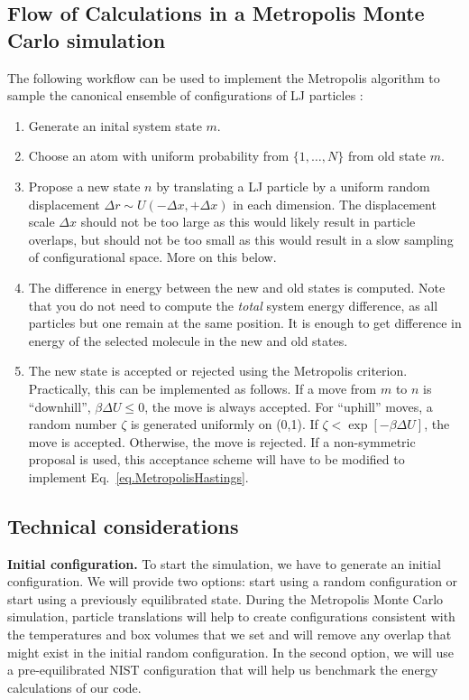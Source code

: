 \documentclass[aip,jcp,preprint,superscriptaddress,floatfix]{revtex4-1}
\begin{document}
\subsection{Flow of Calculations in a Metropolis Monte Carlo simulation}
\label{sec.flow}

The following workflow can be used to implement the Metropolis algorithm to sample the canonical ensemble of configurations of LJ particles \cite{Shell.Notes, Maginn.Notes}:

\begin{enumerate}
\setlength{\itemsep}{0em} %
\item Generate an inital system state $m$.
\item Choose an atom with uniform probability from $\{1, \ldots, N\}$ from old state $m$.
\item Propose a new state $n$ by translating a LJ particle by a uniform random displacement $\Delta r \sim U(-\Delta x, +\Delta x)$ in each dimension.
	The displacement scale $\Delta x$ should not be too large as this would
	likely result in particle overlaps, but should not be too small
	as this would result in a slow sampling of configurational space.
	More on this below.
\item The difference in energy between the new and old states is computed.
	Note that you do not need to compute the \textit{total} system energy
	difference, as all particles but one remain at the same position. 
	It is enough to get difference in energy of the selected molecule 
	in the new and old states.
\item The new state is accepted or rejected using the Metropolis criterion.
	Practically, this can be implemented as follows. 
	If a move from $m$ to $n$ is ``downhill'', $\beta \Delta U \leq 0$,
	the move is always accepted. For ``uphill'' moves, a random
	number $\zeta$ is generated uniformly on (0,1).  
	If $\zeta < \exp[-\beta {\Delta U}]$, the move is
	accepted.  Otherwise, the move is rejected. 
	If a non-symmetric proposal is used, this acceptance scheme will have to be modified to implement Eq.~\ref{eq.MetropolisHastings}.
\end{enumerate}

\subsection{Technical considerations}

\textbf{Initial configuration.} 
To start the simulation, we have to generate an initial configuration. We will provide two options: start using a random configuration or start using a previously equilibrated state. 
During the Metropolis Monte Carlo simulation, particle translations will help to create configurations consistent with the temperatures and
box volumes that we set and will remove any overlap that might exist in the initial random configuration. 
In the second option, we will use a pre-equilibrated NIST configuration that will help us benchmark the energy calculations of our code.
\end{document}
